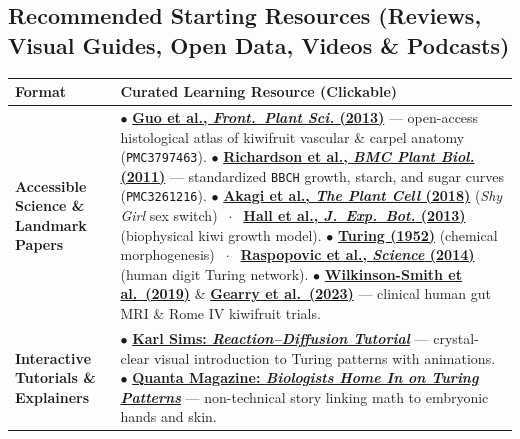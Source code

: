 \documentclass[10.5pt,a4paper]{article}
\begin{document}
\subsection{Recommended Starting Resources (Reviews, Visual Guides, Open Data, Videos \& Podcasts)}

\begin{table}[H]
\centering
\scriptsize
\renewcommand{\arraystretch}{1.20}
\begin{tabularx}{\textwidth}{L{2.55cm} Y}
\toprule
{}
\textbf{Format} & \textbf{Curated Learning Resource (Clickable)} \\
\midrule
\textbf{Accessible Science \& Landmark Papers} &
$\bullet$ \href{https://pmc.ncbi.nlm.nih.gov/articles/PMC3797463/}{\textbf{Guo et al., \emph{Front.\ Plant Sci.} (2013)}} --- open-access histological atlas of kiwifruit vascular \& carpel anatomy (\texttt{PMC3797463}). \newline
$\bullet$ \href{https://pmc.ncbi.nlm.nih.gov/articles/PMC3261216/}{\textbf{Richardson et al., \emph{BMC Plant Biol.} (2011)}} --- standardized \texttt{BBCH} growth, starch, and sugar curves (\texttt{PMC3261216}). \newline
$\bullet$ \href{https://doi.org/10.1105/tpc.17.00787}{\textbf{Akagi et al., \emph{The Plant Cell} (2018)}} (\emph{Shy Girl} sex switch) $\;\cdot\;$ \href{https://doi.org/10.1093/jxb/ert317}{\textbf{Hall et al., \emph{J.\ Exp.\ Bot.} (2013)}} (biophysical kiwi growth model). \newline
$\bullet$ \href{https://doi.org/10.1098/rstb.1952.0012}{\textbf{Turing (1952)}} (chemical morphogenesis) $\;\cdot\;$ \href{https://doi.org/10.1126/science.1252960}{\textbf{Raspopovic et al., \emph{Science} (2014)}} (human digit Turing network). \newline
$\bullet$ \href{https://pubmed.ncbi.nlm.nih.gov/30706488/}{\textbf{Wilkinson-Smith et al.\ (2019)}} \& \href{https://pubmed.ncbi.nlm.nih.gov/36537785/}{\textbf{Gearry et al.\ (2023)}} --- clinical human gut MRI \& Rome IV kiwifruit trials. \\
\textbf{Interactive Tutorials \& Explainers} &
$\bullet$ \href{https://www.karlsims.com/rd.html}{\textbf{Karl Sims: \emph{Reaction--Diffusion Tutorial}}} --- crystal-clear visual introduction to Turing patterns with animations. \newline
$\bullet$ \href{https://www.quantamagazine.org/biologists-home-in-on-turing-patterns-20130325/}{\textbf{Quanta Magazine: \emph{Biologists Home In on Turing Patterns}}} --- non-technical story linking math to embryonic hands and skin. \newline

\end{tabularx}
\end{table}
\end{document}
